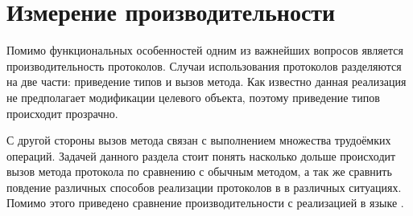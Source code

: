 \section{Измерение производительности} \label{measurements}
Помимо функциональных особенностей одним из важнейших вопросов является производительность протоколов. Случаи использования протоколов разделяются на две части: приведение типов и вызов метода. Как известно данная реализация не предполагает модификации целевого объекта, поэтому приведение типов происходит прозрачно.

С другой стороны вызов метода связан с выполнением множества трудоёмких операций. Задачей данного раздела стоит понять насколько дольше происходит вызов метода протокола по сравнению с обычным методом, а так же сравнить повдение различных способов реализации протоколов в  в различных ситуациях. Помимо этого приведено сравнение производительности с реализацией в языке .



